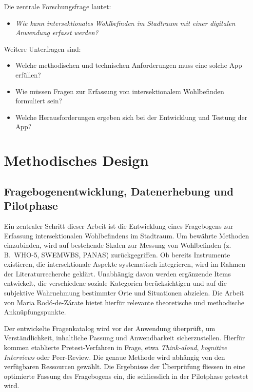 \documentclass{template}
\begin{document}
Die zentrale Forschungsfrage lautet:
\begin{itemize}
    \item \emph{Wie kann intersektionales Wohlbefinden im Stadtraum mit einer digitalen Anwendung erfasst werden?}
\end{itemize}

Weitere Unterfragen sind:
\begin{itemize}
    \item Welche methodischen und technischen Anforderungen muss eine solche App erfüllen?
    \item Wie müssen Fragen zur Erfassung von intersektionalem Wohlbefinden formuliert sein?
    \item Welche Herausforderungen ergeben sich bei der Entwicklung und Testung der App?
\end{itemize}

\section{Methodisches Design}

\subsection{Fragebogenentwicklung, Datenerhebung und Pilotphase}

Ein zentraler Schritt dieser Arbeit ist die Entwicklung eines Fragebogens zur Erfassung intersektionalen Wohlbefindens im Stadtraum. Um bewährte Methoden einzubinden, wird auf bestehende Skalen zur Messung von Wohlbefinden (z.\,B.\ WHO-5, SWEMWBS, PANAS) zurückgegriffen. Ob bereits Instrumente existieren, die intersektionale Aspekte systematisch integrieren, wird im Rahmen der Literaturrecherche geklärt. Unabhängig davon werden ergänzende Items entwickelt, die verschiedene soziale Kategorien berücksichtigen und auf die subjektive Wahrnehmung bestimmter Orte und Situationen abzielen. Die Arbeit von Maria Rodó-de-Zárate \parencite*{rodo-de-zarate_intersectionality_2018, rodo-de-zarate_young_2015, rodo-de-zarate_developing_2014}
bietet hierfür relevante theoretische und methodische Anknüpfungspunkte. 

Der entwickelte Fragenkatalog wird vor der Anwendung überprüft, um Verständlichkeit, inhaltliche Passung und Anwendbarkeit sicherzustellen. Hierfür kommen etablierte Pretest-Verfahren in Frage, etwa \emph{Think-aloud}, \emph{kognitive Interviews} oder Peer-Review. Die genaue Methode wird abhängig von den verfügbaren Ressourcen gewählt. Die Ergebnisse der Überprüfung fliessen in eine optimierte Fassung des Fragebogens ein, die schliesslich in der Pilotphase getestet wird.
\end{document}
